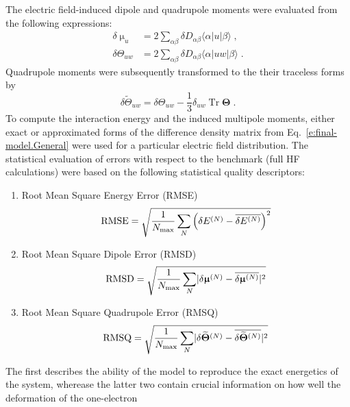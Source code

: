\documentclass[aip,graphicx]{revtex4-1}
\newcommand{\tbraket}[3]{\ensuremath{\bigl\langle {#1} \bigl\lvert {#2} \bigl\lvert {#3} \bigr\rangle}}
\newcommand{\BM}[1]{\bm{#1}}
\DeclareMathOperator{\Tr}{Tr}
\begin{document}
The electric field\hyp{}induced dipole and quadrupole moments were evaluated from the following expressions:
%
\begin{subequations}\label{e:dmult}
  \begin{align}
   \delta \upmu_{u}   &= 2\sum_{\alpha\beta} \delta D_{\alpha\beta} \tbraket{\alpha}{u}{\beta}  \;,\\
   \delta \Theta_{uw} &= 2\sum_{\alpha\beta} \delta D_{\alpha\beta} \tbraket{\alpha}{uw}{\beta} \;. 
  \end{align}
\end{subequations}
%
Quadrupole moments were subsequently transformed to the their traceless forms by
%
\begin{equation}
  \delta \widetilde{\Theta}_{uw} = \delta \Theta_{uw} - \frac{1}{3} \delta_{uw} \Tr{\BM\Theta} \;.
\end{equation}
%
To compute the interaction energy and the induced multipole moments, either exact or approximated forms
of the difference density matrix from Eq.~\eqref{e:final-model.General}
were used for a particular electric field distribution. The statistical evaluation of
errors with respect to the benchmark (full HF calculations) were based on 
the following statistical quality descriptors:
%
\begin{enumerate}
 \item Root Mean Square Energy Error (RMSE)
   \begin{equation}\label{e:rmse}
     {\rm RMSE} = \sqrt{ \frac{1}{N_{\rm max}} \sum_N \left( \delta E^{(N)} - \overline{\delta E^{(N)}}\right)^2 }
   \end{equation}
 \item Root Mean Square Dipole Error (RMSD)
   \begin{equation}\label{e:rmsd}
     {\rm RMSD} = \sqrt{ \frac{1}{N_{\rm max}}\sum_N \lvert \delta {\BM\upmu}^{(N)} - \overline{\delta {\BM\upmu}^{(N)}}\rvert^2 }
   \end{equation}
 \item Root Mean Square Quadrupole Error (RMSQ)
   \begin{equation}\label{e:rmsq}
     {\rm RMSQ} = \sqrt{ \frac{1}{N_{\rm max}}\sum_N \lvert \delta \widetilde{\BM\Theta}^{(N)} - \overline{\delta \widetilde{\BM\Theta}^{(N)}}\rvert^2 }
   \end{equation}
\end{enumerate}
%
The first describes the ability of the model to reproduce the exact energetics of the system, 
wherease the latter two contain crucial information on how well the deformation of the one\hyp{}electron
\end{document}

